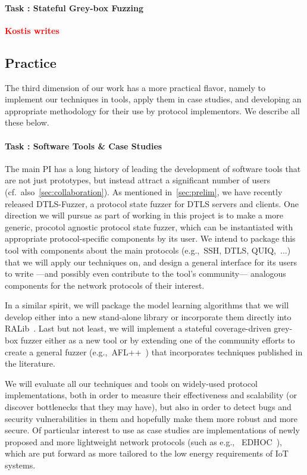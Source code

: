 \documentclass[11pt]{article}
\newcommand{\FIX}[1]{\textcolor{red}{\textbf{#1}}}
\newcommand{\system}[1]{\mbox{\textsf{#1}}}
\newcounter{Task}
\newcommand{\task}[1]{\addtocounter{Task}{1}\paragraph{Task \theTask: #1}}
\newcommand{\significance}[1]{\vspace*{-0.5em}%
  \begin{quoting}\noindent\textbf{Significance:} #1\end{quoting}}
\newcommand{\myparagraph}{}
\let\myparagraph=\paragraph
\renewcommand{\paragraph}{\vspace{-3mm}\myparagraph}
\newcommand{\eg}{e.\/g.,\ }
\begin{document}

\task{Stateful Grey-box Fuzzing} \FIX{Kostis writes}


\subsection{Practice}
The third dimension of our work has a more practical flavor, namely to
implement our techniques in tools, apply them in case studies, and developing
an appropriate methodology for their use by protocol implementors. We describe
all these below.

\task{Software Tools \& Case Studies}
The main PI has a long history of leading the development of software tools
that are not just prototypes, but instead attract a significant number of
users (cf.\ also~\cref{sec:collaboration}).
%
As mentioned in~\cref{sec:prelim}, we have recently released
\system{DTLS-Fuzzer}, a protocol state fuzzer for DTLS servers and clients.
One direction we will pursue as part of working in this project is to make a
more generic, procotol agnostic protocol state fuzzer, which can be
instantiated with appropriate protocol-specific components by its user.  We
intend to package this tool with components about the main protocols (\eg SSH,
DTLS, QUIQ,~$\ldots$) that we will apply our techniques on, and design a
general interface for its users to write ---and possibly even contribute to
the tool's community--- analogous components for the network protocols of
their interest.

In a similar spirit, we will package the model learning algorithms that we
will develop either into a new stand-alone library or incorporate them
directly into \system{RALib}~\cite{CasselHJS16}.
%
Last but not least, we will implement a stateful coverage-driven grey-box
fuzzer either as a new tool or by extending one of the community efforts to
create a general fuzzer (\eg \system{AFL++}~\cite{AFL++@Woot-20}) that
incorporates techniques published in the literature.

We will evaluate all our techniques and tools on widely-used protocol
implementations, both in order to measure their effectiveness and scalability
(or discover bottlenecks that they may have), but also in order to detect bugs
and security vulnerabilities in them and hopefully make them more robust and
more secure. Of particular interest to use as case studies are implementations
of newly proposed and more lightweight network protocols (such as \eg
EDHOC~\cite{ietf-lake-edhoc-18}), which are put forward as more tailored to
the low energy requirements of IoT systems.
\end{document}
